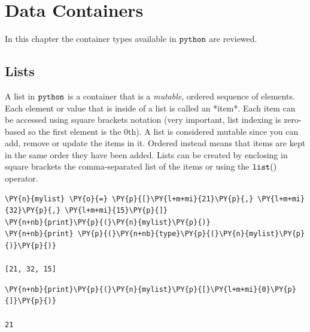 \chapter{Data Containers}\label{introduction-to-python---lesson-1.5}

In this chapter the container types available in $\tt{python}$ are reviewed.

\section{Lists}\label{lists}

A list in $\tt{python}$ is a container that is a \emph{mutable}, ordered sequence of elements. Each element or value that is inside of a list is called an *item*. Each item can be accessed using square brackets notation (very important, list indexing is zero-based so the first element is the 0th). A list is considered mutable since you can add, remove or update the items in it. Ordered instead means that items are kept in the same order they have been added.
Lists can be created by enclosing in square brackets the comma-separated list of the items or using the $\tt{list()}$ operator.

\begin{tcolorbox}[breakable, size=fbox, boxrule=1pt, pad at break*=1mm, colback=cellbackground, colframe=cellborder]
\begin{Verbatim}[commandchars=\\\{\}]
\PY{n}{mylist} \PY{o}{=} \PY{p}{[}\PY{l+m+mi}{21}\PY{p}{,} \PY{l+m+mi}{32}\PY{p}{,} \PY{l+m+mi}{15}\PY{p}{]}
\PY{n+nb}{print}\PY{p}{(}\PY{n}{mylist}\PY{p}{)}
\PY{n+nb}{print} \PY{p}{(}\PY{n+nb}{type}\PY{p}{(}\PY{n}{mylist}\PY{p}{)}\PY{p}{)}

[21, 32, 15]
\end{Verbatim}
\end{tcolorbox}

\begin{tcolorbox}[breakable, size=fbox, boxrule=1pt, pad at break*=1mm, colback=cellbackground, colframe=cellborder]
\begin{Verbatim}[commandchars=\\\{\}]
\PY{n+nb}{print}\PY{p}{(}\PY{n}{mylist}\PY{p}{[}\PY{l+m+mi}{0}\PY{p}{]}\PY{p}{)}

21
\end{Verbatim}
\end{tcolorbox}

